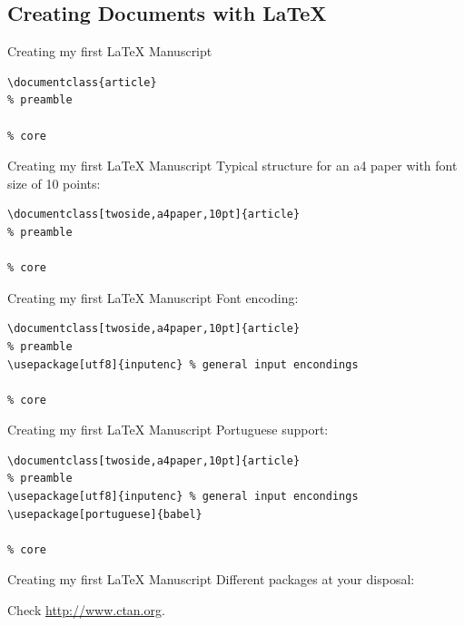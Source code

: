 \subsection{Creating Documents with \LaTeX{}}
\begin{frame}[fragile]{Creating my first \LaTeX{} Manuscript}
\begin{verbatim}
\documentclass{article}
% preamble

% core

\end{verbatim}
\end{frame}


\begin{frame}[fragile]{Creating my first \LaTeX{} Manuscript}
Typical structure for an a4 paper with font size of 10 points:
\footnotesize
\begin{verbatim}
\documentclass[twoside,a4paper,10pt]{article}
% preamble

% core

\end{verbatim}
\end{frame}

\begin{frame}[fragile]{Creating my first \LaTeX{} Manuscript}
Font encoding:
\footnotesize
\begin{verbatim}
\documentclass[twoside,a4paper,10pt]{article}
% preamble
\usepackage[utf8]{inputenc} % general input encondings

% core

\end{verbatim}
\end{frame}

\begin{frame}[fragile]{Creating my first \LaTeX{} Manuscript}
Portuguese support:
\footnotesize
\begin{verbatim}
\documentclass[twoside,a4paper,10pt]{article}
% preamble
\usepackage[utf8]{inputenc} % general input encondings
\usepackage[portuguese]{babel}

% core

\end{verbatim}
\end{frame}

\begin{frame}[fragile]{Creating my first \LaTeX{} Manuscript}
Different packages at your disposal:
\footnotesize
{}
Check \url{http://www.ctan.org}.
\end{frame}


